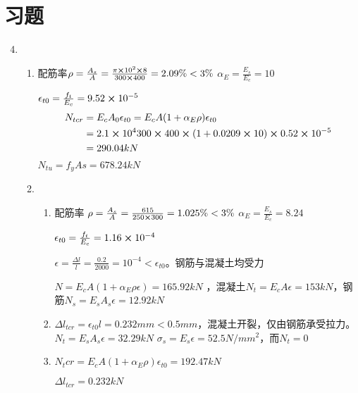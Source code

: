 \documentclass{article}
\begin{document}
\section{习题}
\begin{enumerate} %
    \setcounter{enumi}{3}
    \item  \begin{enumerate}[1.]
              \item  配筋率$\rho=\frac{A_s}{A}=\frac{\pi\cross 10^2\cross 8}{300\cross 400}=2.09\%<3\%$
                    $\alpha_E=\frac{E_s}{E_c}=10$
                    \par$\epsilon_{t0}=\frac{f_t}{E_c}=9.52\cross10^{-5}$
                    \begin{align*}
                        N_{tcr} & = E_cA_0\epsilon_{t0}=E_cA(1+\alpha_E\rho)\epsilon_{t0}                     \\
                                & = 2.1\cross10^4300\cross400\cross(1+0.0209\cross10)\cross0.52\cross 10^{-5} \\
                                & = 290.04kN
                    \end{align*}
                    $N_{tu}=f_yAs=678.24kN$
              \item \begin{enumerate}
                        \item 配筋率 $\rho = \frac{A_s}{A}=\frac{615}{250\cross300}=1.025\%<3\%$
                              $\alpha_E=\frac{E_s}{E_c}=8.24$
                              \par$\epsilon_{t0}=\frac{f_t}{E_c}=1.16\cross10^{-4}$
                              \par$\epsilon=\frac{\Delta l}{l}=\frac{0.2}{2000}=10^{-4}<\epsilon_{t0}$。钢筋与混凝土均受力
                              \par$N=E_cA(1+\alpha_E\rho\epsilon)=165.92kN$
                              ，混凝土$N_t=E_cA\epsilon=153kN$，钢筋$N_s=E_sA_s\epsilon=12.92kN$
                        \item $\Delta l_{tcr}=\epsilon_{t0}l=0.232mm<0.5mm$，混凝土开裂，仅由钢筋承受拉力。
                              $N_t=E_sA_s\epsilon=32.29kN$
                              $\sigma_s=E_s\epsilon=52.5N/mm^2$，而$N_t=0$
                        \item $N_tcr=E_cA(1+\alpha_E\rho)\epsilon_{t0}=192.47kN$
                              \par$\Delta l_{tcr}=0.232kN$

\end{enumerate}
\end{enumerate}
\end{enumerate}
\end{document}
